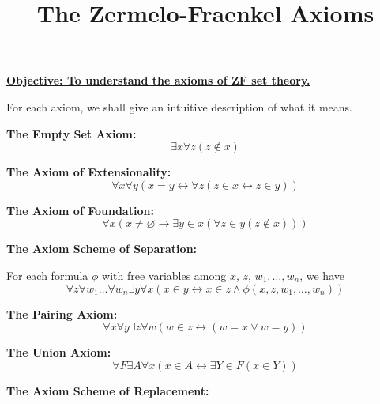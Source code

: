 \documentclass{article}
\begin{document}
\title{The Zermelo-Fraenkel Axioms}
\date{}

\maketitle
\thispagestyle{empty}

\Large

\textbf{\underline{Objective: To understand the axioms of ZF set theory.}}


\vspace{5mm}


For each axiom, we shall give an intuitive description of what it means.

\vspace{5mm}


\textbf{The Empty Set Axiom:}\bigskip
\[\exists x\forall z(z\notin x)\]

\vfill


\textbf{The Axiom of Extensionality:}\bigskip
\[\forall x \forall y (x=y\leftrightarrow \forall z(z\in x\leftrightarrow z\in y))\]

\vfill






\clearpage


\textbf{The Axiom of Foundation:}\bigskip
\[\forall x(x\neq \varnothing\rightarrow\exists y\in x(\forall z \in y(z\notin x)))\]


\vfill


\textbf{The Axiom Scheme of Separation:}\bigskip

For each formula $\phi$ with free variables among $x$, $z$, $w_1,\hdots,w_n$, we have
\[\forall z\forall w_1\hdots\forall w_n\exists y\forall x (x\in y\leftrightarrow x\in z\wedge \phi(x,z,w_1,\hdots,w_n))\]

\vfill

\textbf{The Pairing Axiom:}\bigskip
\[\forall x\forall y\exists z\forall w(w\in z\leftrightarrow(w=x\vee w=y))\]

\vfill



\clearpage






\textbf{The Union Axiom:}\bigskip
\[\forall F\exists A\forall x(x\in A\leftrightarrow\exists Y\in F(x\in Y))\]

\vfill



\textbf{The Axiom Scheme of Replacement:}\bigskip
\end{document}
